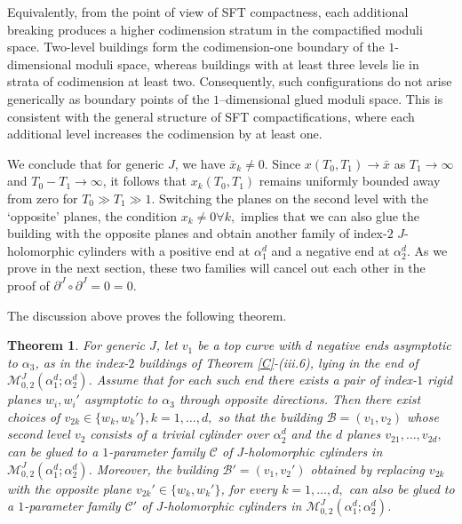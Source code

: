 \documentclass{amsart}
\newtheorem{theorem}{Theorem}[section]
\begin{document}
Equivalently, from the point of view of SFT compactness, each additional
breaking produces a higher codimension stratum in the compactified moduli space. Two-level buildings form the codimension-one boundary of the $1$-dimensional moduli space, whereas buildings with at least three levels lie in strata of codimension at least two. Consequently, such configurations do not arise generically as boundary
points of the $1$--dimensional glued moduli space. This is consistent with the general structure of SFT compactifications, where each additional level increases the codimension by at least one.

We conclude that for generic $J$, we have $\bar x_k \neq 0$.
Since $x(T_0,T_1) \to \bar x$ as $T_1 \to \infty$ and $T_0 - T_1 \to
\infty$, it follows that $x_k(T_0,T_1)$ remains uniformly bounded away
from zero for $T_0 \gg T_1 \gg 1$.  Switching the planes on the second level with the `opposite' planes, the condition $x_k \neq 0 \forall k,$ implies that we can also glue the building with the opposite planes and obtain another family of index-$2$ $J$-holomorphic cylinders with a positive end at $\alpha_1^d$ and a negative end at $\alpha_2^d$. As we prove in the next section, these two families will cancel out each other in the proof of $\partial^J \circ \partial^J =0=0$.

The discussion above proves the following theorem.

\begin{theorem}
\label{thm:gluing-opposite}
For generic $J$, let $v_1$ be a top curve with $d$ negative ends asymptotic to $\alpha_3$, as in the index-$2$ buildings of Theorem \ref{C}-(iii.6), lying in the end of $\mathcal M^J_{0,2}(\alpha_1^d ; \alpha_2^d)$.   Assume that for each such end there exists a pair of index-$1$ rigid planes $w_i, w_i'$ asymptotic to $\alpha_3$ through opposite directions.
Then there exist choices of $v_{2k}\in \{w_k,w_k'\},k=1,\ldots,d,$ so that the building $\mathcal B=(v_1,v_2)$ whose second level $v_2$ consists of a trivial cylinder over $\alpha_2^d$ and the $d$ planes $v_{21},\ldots,v_{2d},$ can be glued to a $1$-parameter family $\mathcal C$ of 
$J$-holomorphic cylinders in $\mathcal M^J_{0,2}(\alpha_1^d ; \alpha_2^d)$.
Moreover, the building 
 $\mathcal B'=(v_1,v_2')$ obtained by replacing $v_{2k}$ with the opposite plane $v_{2k}'\in \{w_k,w_k'\}$, for every $k=1,\ldots, d,$ can also be glued to a 
$1$-parameter family $\mathcal C'$ of $J$-holomorphic cylinders in $\mathcal M^J_{0,2}(\alpha_1^d ; \alpha_2^d)$.
\end{theorem}
\end{document}
